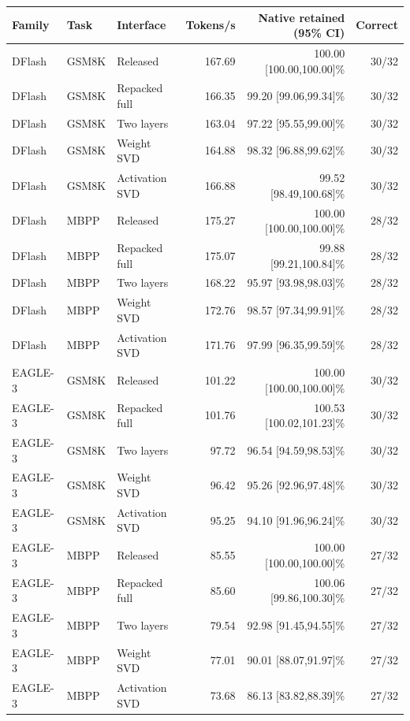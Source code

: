 \begin{tabular}{lllrrr}
\toprule
Family & Task & Interface & Tokens/s & Native retained (95\% CI) & Correct \\
\midrule
DFlash & GSM8K & Released & 167.69 & 100.00 [100.00,100.00]\% & 30/32 \\
DFlash & GSM8K & Repacked full & 166.35 & 99.20 [99.06,99.34]\% & 30/32 \\
DFlash & GSM8K & Two layers & 163.04 & 97.22 [95.55,99.00]\% & 30/32 \\
DFlash & GSM8K & Weight SVD & 164.88 & 98.32 [96.88,99.62]\% & 30/32 \\
DFlash & GSM8K & Activation SVD & 166.88 & 99.52 [98.49,100.68]\% & 30/32 \\
\midrule
DFlash & MBPP & Released & 175.27 & 100.00 [100.00,100.00]\% & 28/32 \\
DFlash & MBPP & Repacked full & 175.07 & 99.88 [99.21,100.84]\% & 28/32 \\
DFlash & MBPP & Two layers & 168.22 & 95.97 [93.98,98.03]\% & 28/32 \\
DFlash & MBPP & Weight SVD & 172.76 & 98.57 [97.34,99.91]\% & 28/32 \\
DFlash & MBPP & Activation SVD & 171.76 & 97.99 [96.35,99.59]\% & 28/32 \\
\midrule
EAGLE-3 & GSM8K & Released & 101.22 & 100.00 [100.00,100.00]\% & 30/32 \\
EAGLE-3 & GSM8K & Repacked full & 101.76 & 100.53 [100.02,101.23]\% & 30/32 \\
EAGLE-3 & GSM8K & Two layers & 97.72 & 96.54 [94.59,98.53]\% & 30/32 \\
EAGLE-3 & GSM8K & Weight SVD & 96.42 & 95.26 [92.96,97.48]\% & 30/32 \\
EAGLE-3 & GSM8K & Activation SVD & 95.25 & 94.10 [91.96,96.24]\% & 30/32 \\
\midrule
EAGLE-3 & MBPP & Released & 85.55 & 100.00 [100.00,100.00]\% & 27/32 \\
EAGLE-3 & MBPP & Repacked full & 85.60 & 100.06 [99.86,100.30]\% & 27/32 \\
EAGLE-3 & MBPP & Two layers & 79.54 & 92.98 [91.45,94.55]\% & 27/32 \\
EAGLE-3 & MBPP & Weight SVD & 77.01 & 90.01 [88.07,91.97]\% & 27/32 \\
EAGLE-3 & MBPP & Activation SVD & 73.68 & 86.13 [83.82,88.39]\% & 27/32 \\
\bottomrule
\end{tabular}
